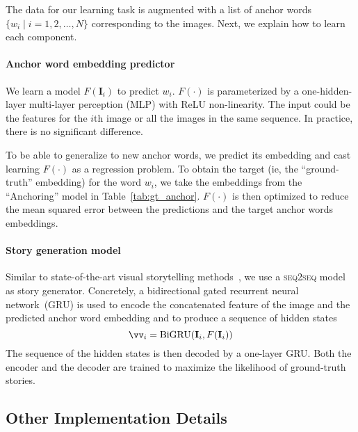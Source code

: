 The data for our learning task is augmented with a list of anchor words $\{w_i \mid i=1, 2,\ldots, N\}$ corresponding to the images. Next, we explain how to learn each component.

\vspace{-10pt}

\paragraph{Anchor word embedding predictor} We learn a model $F(\mathbf{I}_i)$ to predict $w_i$. $F(\cdot)$ is parameterized by a  one-hidden-layer multi-layer perception (MLP) with ReLU non-linearity. The input could be the features for the $i$th image or all the images in the same sequence. In practice, there is no significant difference.

To be able to generalize to new anchor words, we predict its embedding and cast learning $F(\cdot)$ as a regression problem. To obtain the target (ie, the ``ground-truth'' embedding) for the word $w_i$, we take the embeddings from the ``Anchoring'' model in Table~\ref{tab:gt_anchor}. $F(\cdot)$ is then optimized to reduce the mean squared error between the predictions and the target anchor words embeddings.

\vspace{-10pt}

\paragraph{Story generation model} Similar to state-of-the-art visual storytelling methods~\cite{wang2018no,huang2016visual}, we use a \textsc{seq2seq} model~\cite{sutskever2014sequence} as story generator. Concretely, a bidirectional gated recurrent neural network~\cite{chung2014empirical}(GRU) is used to encode the concatenated feature of the image and the predicted anchor word embedding and to produce a sequence of hidden states
    \vspace{-5pt}
\begin{equation}
\vv_i = \text{BiGRU}(\mathbf{I}_i, F(\mathbf{I}_i))
    \vspace{-5pt}
\end{equation}
The sequence of the hidden states is then decoded by a one-layer GRU.  Both the encoder and the decoder are trained to maximize the likelihood of ground-truth stories.

\subsection{Other Implementation Details}

